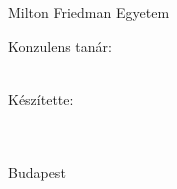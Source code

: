 \thispagestyle{empty}

\begin{flushleft}
    {\Large Milton Friedman Egyetem}\\
    {\large \TANSZEK}
\end{flushleft}

\vspace{7cm}  %

\begin{center}
    {\Huge \textbf{\CIM}}
\end{center}

\vspace{7cm}  %

\noindent
\begin{minipage}[t]{0.45\textwidth}
    {\Large Konzulens tanár:}\\
    {\Large \KONZULENS}\\
    {\Large \KONZULENSBEOSZTAS}
\end{minipage}
\hfill
\begin{minipage}[t]{0.36\textwidth}
    {\Large Készítette:}\\
    {\Large \SZERZO}\\
    {\Large \NEPTUNKOD}\\
    {\Large \SZAK}
\end{minipage}

\vspace{3cm} 

\begin{center}
    {\Large Budapest}\\
    {\Large \VEDESEVE}
\end{center}
